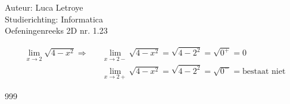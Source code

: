 \documentclass[a4paper]{article}
\begin{document}
  
\noindent \large Auteur: Luca Letroye \\
\noindent \large Studierichting: Informatica\\
\noindent \large Oefeningenreeks 2D nr. 1.23\\

\medskip

\normalsize

\begin{eqnarray*}
\lim\limits_{x\rightarrow 2}\sqrt{4 - x^2} \Rightarrow && \lim\limits_{x\rightarrow 2-} \sqrt{4-x^2} = \sqrt{4-2^2} = \sqrt{0^+} = 0\\
&& \lim\limits_{x\rightarrow 2+}  \sqrt{4-x^2} = \sqrt{4-2^2} = \sqrt{0^-} = \text{bestaat niet}
\end{eqnarray*}


\begin{thebibliography}{999}
\end{thebibliography}
\end{document}
